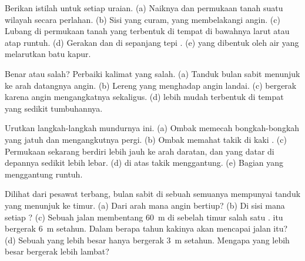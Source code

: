 \begin{exercise}[$\star$]\label{exo:g9:landforms:2}
Berikan istilah untuk setiap uraian. (a) Naiknya  dan permukaan
tanah suatu wilayah secara perlahan. (b) Sisi  yang curam, yang
membelakangi angin. (c) Lubang di permukaan tanah yang terbentuk di tempat
 di bawahnya larut atau atap  runtuh. (d) Gerakan  dan
 di sepanjang tepi . (e)  yang dibentuk oleh air
yang melarutkan batu kapur.
\end{exercise}

\begin{exercise}[$\star$]\label{exo:g9:landforms:3}
Benar atau salah? Perbaiki kalimat yang salah. (a) Tanduk 
bulan sabit menunjuk ke arah datangnya angin. (b) Lereng  yang
menghadap angin landai. (c)  bergerak karena angin
mengangkatnya sekaligus. (d)  lebih mudah terbentuk di tempat
yang sedikit tumbuhannya.
\end{exercise}

\begin{exercise}[$\star$]\label{exo:g9:landforms:4}
Urutkan langkah-langkah mundurnya   ini. (a) Ombak memecah
bongkah-bongkah yang jatuh dan mengangkutnya pergi. (b) Ombak memahat
takik di kaki . (c) Permukaan  sekarang berdiri lebih jauh ke
arah daratan, dan  yang datar di depannya sedikit lebih lebar.
(d)  di atas takik menggantung. (e) Bagian yang menggantung runtuh.
\end{exercise}

\begin{exercise}[$\star\star$]\label{exo:g9:landforms:5}
Dilihat dari pesawat terbang,   bulan sabit di sebuah
 semuanya mempunyai tanduk yang menunjuk ke timur. (a) Dari arah mana
angin bertiup? (b) Di sisi mana  setiap ? (c) Sebuah
jalan membentang \qty{60}{m} di sebelah timur salah satu .  itu
bergerak \qty{6}{m} setahun. Dalam berapa tahun kakinya akan mencapai
jalan itu? (d) Sebuah  yang lebih besar hanya bergerak \qty{3}{m}
setahun. Mengapa  yang lebih besar bergerak lebih lambat?
\end{exercise}

